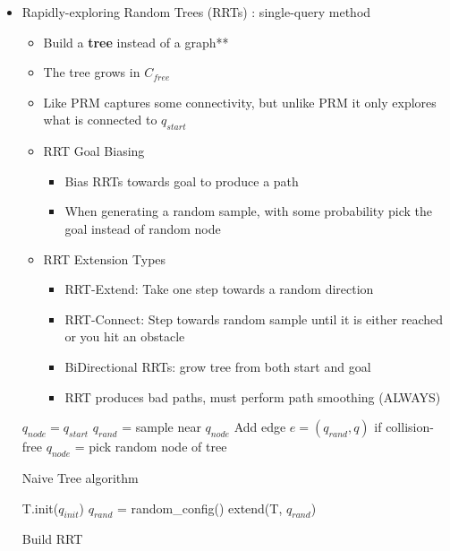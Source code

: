 \documentclass[../main.tex]{subfiles}
\begin{document}
\begin{itemize}
\begin{enumerate}
        \end{enumerate}
        \item Rapidly-exploring Random Trees (RRTs) : single-query method
        \begin{itemize}
            \item Build a \textbf{tree} instead of a graph**
            \item The tree grows in $C_{free}$
            \item Like PRM captures some connectivity, but unlike PRM it only explores what is connected to $q_{start}$
            \item RRT Goal Biasing
            \begin{itemize}
                \item Bias RRTs towards goal to produce a path
                \item When generating a random sample, with some probability pick the goal instead of random node
            \end{itemize}
            \item RRT Extension Types
            \begin{itemize}
                \item RRT-Extend: Take one step towards a random direction
                \item RRT-Connect: Step towards random sample until it is either reached or you hit an obstacle
                \item BiDirectional RRTs: grow tree from both start and goal
                \item RRT produces bad paths, must perform path smoothing (ALWAYS)
            \end{itemize}
        \end{itemize}
        \begin{algorithm}[H]
            \SetAlgoLined
            $q_{node} = q_{start}$\;
             {
                $q_{rand}$ = sample near $q_{node}$\;
                Add edge $e = (q_{rand}, q)$ if collision-free\;
                $q_{node}$ = pick random node of tree\;
            }
            \caption{Naive Tree algorithm}
        \end{algorithm}
        \begin{algorithm}[H]
            \SetAlgoLined
            T.init($q_{init}$)\;
             {
                $q_{rand}$ = random\_config()\;
                extend(T, $q_{rand}$)\;
            }
            \caption{Build RRT}
        \end{algorithm}
    \end{itemize}
\end{document}
